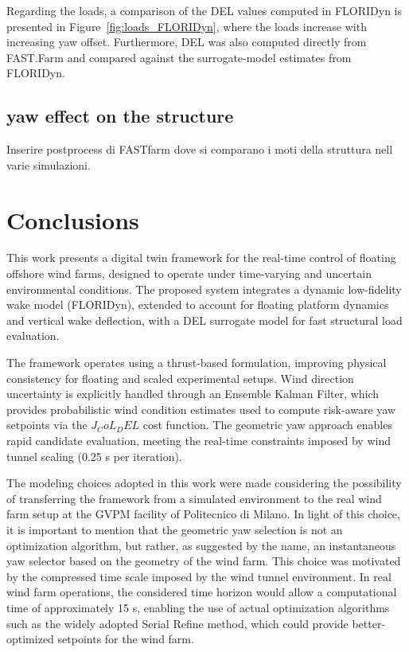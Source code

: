 \documentclass[final,5p,times,twocolumn]{elsarticle}
\begin{document}
Regarding the loads, a comparison of the DEL values computed in FLORIDyn is presented in Figure~\ref{fig:loads_FLORIDyn}, where the loads increase with increasing yaw offset. Furthermore, DEL was also computed directly from FAST.Farm and compared against the surrogate-model estimates from FLORIDyn.

\subsection{yaw effect on the structure}
Inserire postprocess di FASTfarm dove si comparano i moti della struttura nell varie simulazioni.

\section{Conclusions}

This work presents a digital twin framework for the real-time control of floating offshore wind farms, designed to operate under time-varying and uncertain environmental conditions. The proposed system integrates a dynamic low-fidelity wake model (FLORIDyn), extended to account for floating platform dynamics and vertical wake deflection, with a DEL surrogate model for fast structural load evaluation.

The framework operates using a thrust-based formulation, improving physical consistency for floating and scaled experimental setups. Wind direction uncertainty is explicitly handled through an Ensemble Kalman Filter, which provides probabilistic wind condition estimates used to compute risk-aware yaw setpoints via the $J_CoL_DEL$ cost function. The geometric yaw approach enables rapid candidate evaluation, meeting the real-time constraints imposed by wind tunnel scaling (0.25 s per iteration).

The modeling choices adopted in this work were made considering the possibility of transferring the framework from a simulated environment to the real wind farm setup at the GVPM facility of Politecnico di Milano. In light of this choice, it is important to mention that the geometric yaw selection is not an optimization algorithm, but rather, as suggested by the name, an instantaneous yaw selector based on the geometry of the wind farm. This choice was motivated by the compressed time scale imposed by the wind tunnel environment. In real wind farm operations, the considered time horizon would allow a computational time of approximately 15 s, enabling the use of actual optimization algorithms such as the widely adopted Serial Refine method, which could provide better-optimized setpoints for the wind farm.
\end{document}
